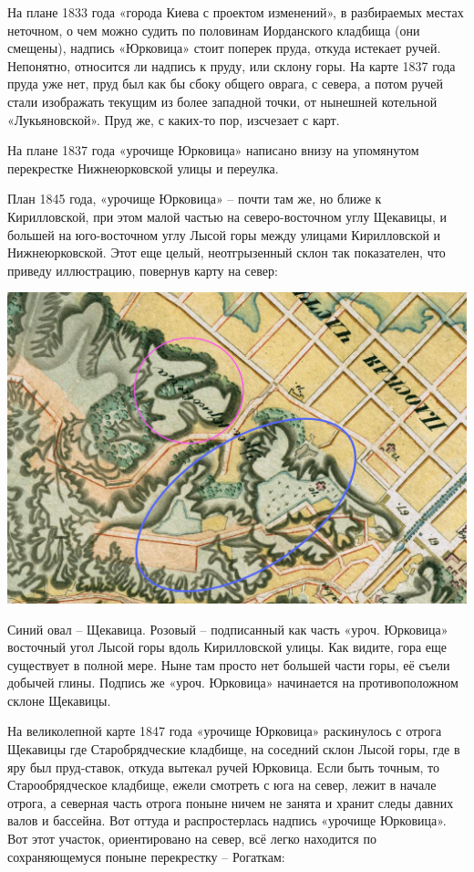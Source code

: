 На плане 1833 года «города Киева с проектом изменений», в разбираемых местах неточном, о чем можно судить по половинам Иорданского кладбища (они смещены), надпись «Юрковица» стоит поперек пруда, откуда истекает ручей. Непонятно, относится ли надпись к пруду, или склону горы. На карте 1837 года пруда уже нет, пруд был как бы сбоку общего оврага, с севера, а потом ручей стали изображать текущим из более западной точки, от нынешней котельной «Лукьяновской». Пруд же, с каких-то пор, изсчезает с карт.

На плане 1837 года «урочище Юрковица» написано внизу на упомянутом перекрестке Нижнеюрковской улицы и переулка.

План 1845 года, «урочище Юрковица» – почти там же, но ближе к Кирилловской, при этом малой частью на северо-восточном углу Щекавицы, и большей на юго-восточном углу Лысой горы между улицами Кирилловской и Нижнеюрковской. Этот еще целый, неотгрызенный склон так показателен, что приведу иллюстрацию, повернув карту на север:

\begin{center}
\includegraphics[width=\linewidth]{chast-kirvys/poisk-yourk/1845-marked.jpg}
\end{center} 

Синий овал – Щекавица. Розовый – подписанный как часть «уроч. Юрковица» восточный угол Лысой горы вдоль Кирилловской улицы. Как видите, гора еще существует в полной мере. Ныне там просто нет большей части горы, её съели добычей глины. Подпись же «уроч. Юрковица» начинается на противоположном склоне Щекавицы.

На великолепной карте 1847 года «урочище Юрковица» раскинулось с отрога Щекавицы где Старобрядческие кладбище, на соседний склон Лысой горы, где в яру был пруд-ставок, откуда вытекал ручей Юрковица. Если быть точным, то Старообрядческое кладбище, ежели смотреть с юга на север, лежит в начале отрога, а северная часть отрога поныне ничем не занята и хранит следы давних валов и бассейна. Вот оттуда и распростерлась надпись «урочище Юрковица». Вот этот участок, ориентировано на север, всё легко находится по сохраняющемуся поныне перекрестку – Рогаткам:

